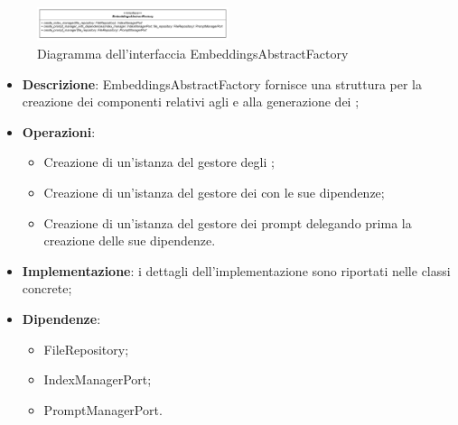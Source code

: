 
 \label{EmbeddingsAbstractFactory}
\begin{figure}[H]
    \centering
    \includegraphics[width=0.5\textwidth]{assets/Backend/embeddings_abstract_factory.png}
    \caption{Diagramma dell'interfaccia EmbeddingsAbstractFactory}
  \end{figure}
\begin{itemize}
    \item \textbf{Descrizione}: EmbeddingsAbstractFactory fornisce una struttura per la creazione dei componenti relativi agli  e alla generazione dei ;
    \item \textbf{Operazioni}:
    \begin{itemize}
      \item Creazione di un'istanza del gestore degli ;
      \item Creazione di un'istanza del gestore dei  con le sue dipendenze;
      \item Creazione di un'istanza del gestore dei prompt delegando prima la creazione delle sue dipendenze.
    \end{itemize}
    \item \textbf{Implementazione}: i dettagli dell'implementazione sono riportati nelle classi concrete;
    \item \textbf{Dipendenze}:
    \begin{itemize}
        \item FileRepository;
        \item IndexManagerPort;
        \item PromptManagerPort.
    \end{itemize}
\end{itemize}  


